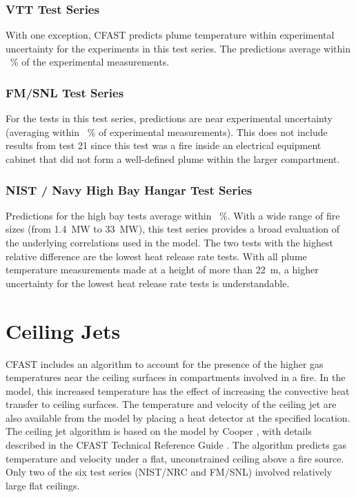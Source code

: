 \subsubsection{VTT Test Series}

With one exception, CFAST predicts plume temperature within experimental uncertainty for the experiments in this test series. The predictions average within \Plumevtt~\% of the experimental measurements.

\subsubsection{FM/SNL Test Series}

For the tests in this test series, predictions are near experimental uncertainty (averaging within \Plumefmsnl~\% of experimental measurements). This does not include results from test 21 since this test was a fire inside an electrical equipment cabinet that did not form a well-defined plume within the larger compartment.

\subsubsection{NIST / Navy High Bay Hangar Test Series}

Predictions for the high bay tests average within \Plumehighbay~\%.  With a wide range of fire sizes (from 1.4~MW to 33~MW), this test series provides a broad evaluation of the underlying correlations used in the model.  The two tests with the highest relative difference are the lowest heat release rate tests.  With all plume temperature measurements made at a height of more than 22~m, a higher uncertainty for the lowest heat release rate tests is understandable.

\section{Ceiling Jets}

CFAST includes an algorithm to account for the presence of the higher gas temperatures near the ceiling surfaces in compartments involved in a fire.  In the model, this increased temperature has the effect of increasing the convective heat transfer to ceiling surfaces.  The temperature and velocity of the ceiling jet are also available from the model by placing a heat detector at the specified location.  The ceiling jet algorithm is based on the model by Cooper \cite{Cooper:1991}, with details described in the CFAST Technical Reference Guide \cite{CFAST_Tech_Guide_6}.  The algorithm predicts gas temperature and velocity under a flat, unconstrained ceiling above a fire source.  Only two of the six test series (NIST/NRC and FM/SNL) involved relatively large flat ceilings.  

